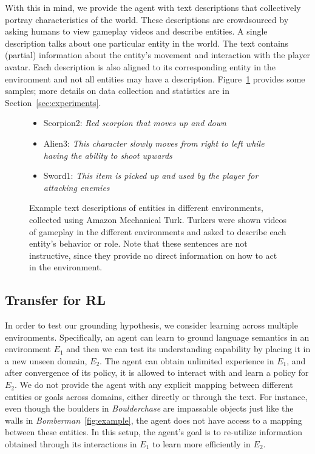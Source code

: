 With this in mind, we provide the agent with text descriptions that collectively portray characteristics of the world. These descriptions are crowdsourced by asking humans to view gameplay videos and describe entities.  A single description talks about one particular entity in the world. The text contains (partial) information about the entity's movement and interaction with the player avatar. Each description is also aligned to its corresponding entity in the environment and not all entities may have a description.
Figure~\ref{fig:descriptions} provides some samples; more details on data collection and statistics are in Section~\ref{sec:experiments}. 

\begin{figure}
  \begin{annotationbox}
    \small
      \begin{itemize}
        \item Scorpion2: \emph{Red scorpion that moves up and down} 
        \item Alien3: \emph{This character slowly moves from right to left while having the ability to shoot upwards}
        \item Sword1: \emph{This item is picked up and used by the player for attacking enemies}
      \end{itemize}
  \end{annotationbox}
  \caption{Example text descriptions of entities in different environments, collected using Amazon Mechanical Turk. Turkers were shown videos of gameplay in the different environments and asked to describe each entity's behavior or role. Note that these sentences are not instructive, since they provide no direct information on how to act in the environment.}
  \label{fig:descriptions}
\end{figure}

\subsection{Transfer for RL}
In order to test our grounding hypothesis, we consider learning across multiple environments. Specifically, an agent can learn to ground language semantics in an environment $E_1$ and then we can test its understanding capability by placing it in a new unseen domain, $E_2$. The agent can obtain unlimited experience in $E_1$, and after convergence of its policy, it is allowed to interact with and learn a policy for $E_2$. We do not provide the agent with any explicit mapping between different entities or goals across domains, either directly or through the text. For instance, even though the boulders in \emph{Boulderchase} are impassable objects just like the walls in \emph{Bomberman}~\ref{fig:example}, the agent does not have access to a mapping between these entities. In this setup, the agent's goal is to re-utilize information obtained through its interactions in $E_1$ to learn more efficiently in $E_2$.



